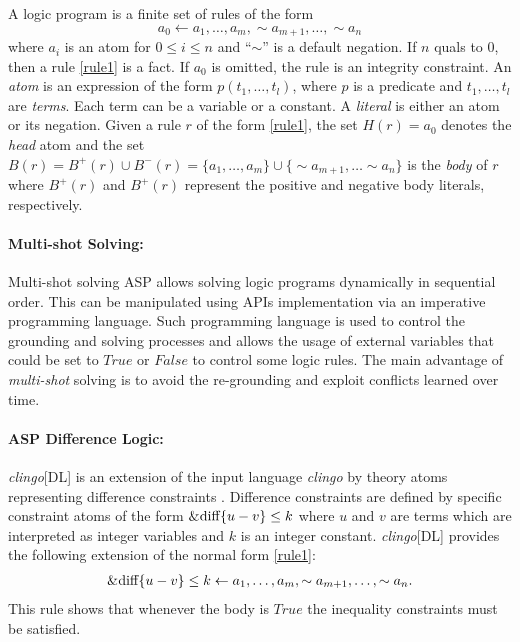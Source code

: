 \documentclass{tlp} %
\begin{document}
A logic program is a finite set of rules of the form 
\begin{equation}
	a_0 \gets a_1, \ldots, a_m, \sim a_{m+1}, \dots, \sim a_n
	\label{rule1}
\end{equation}
where $a_i$ is an atom for $0 \leq i \leq n$ and ``$\sim$''  is a default negation. If $n$ quals to $0$, then a rule \eqref{rule1} is a fact. If $a_0$ is omitted, the rule is an integrity constraint. An \emph{atom} is an expression of the form $p(t_1,\ldots,t_l)$, where $p$ is a predicate and $t_1,\ldots,t_l$ are \emph{terms}. Each term can be a variable or a constant. A \emph{literal} is either an atom or its negation. 
Given a rule $r$ of the form \eqref{rule1}, the set $H(r)=a_0$ denotes the \emph{head} atom and the set $B(r) = B^+(r) \cup B^-(r) = \{a_1,\dots,a_m\} \cup \{\sim a_{m+1}, \dots \sim a_n\}$ is the \emph{body} of $r$ where $B^+(r)$ and $B^+(r)$ represent the positive and negative body literals, respectively.
\paragraph{Multi-shot Solving:}
Multi-shot solving ASP allows solving logic programs dynamically in sequential order. This can be manipulated using APIs implementation via an imperative programming language. Such programming language is used to control the grounding and solving processes and allows the usage of external variables that could be set to $True$ or $False$ to control some logic rules. The main advantage of \emph{multi-shot} solving is to avoid the re-grounding and exploit conflicts learned over time.
\paragraph{ASP Difference Logic:}
\emph{clingo}[DL] is an extension of the input language \emph{clingo} by theory atoms representing difference constraints \cite{gebser2016theory,janhunen2017clingo}. Difference constraints are defined by specific constraint atoms of the form $\text{\lstinline{&diff}}\{u-v\} \leq k$ where $u$ and $v$ are terms which are interpreted as integer variables and $k$ is an integer constant. \emph{clingo}[DL] provides the following extension of the normal form \eqref{rule1}: 
\begin{align*}
	\text{\lstinline{&diff}}\{u-v\} \leq k \gets a_1, \ldots, a_m, \sim a_{m+1}, \ldots, \sim a_n.
\end{align*}
 This rule shows that whenever the body is $True$ the inequality constraints must be satisfied.
\end{document}
